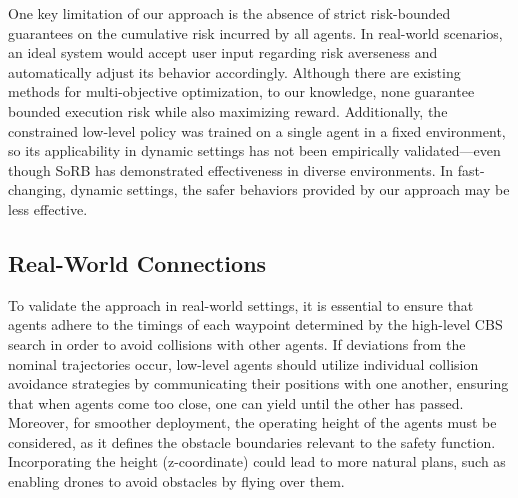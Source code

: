 \documentclass{article}
\begin{document}
One key limitation of our approach is the absence of strict risk-bounded guarantees on the cumulative risk incurred by all agents. In real-world scenarios, an ideal system would accept user input regarding risk averseness and automatically adjust its behavior accordingly. Although there are existing methods for multi-objective optimization, to our knowledge, none guarantee bounded execution risk while also maximizing reward. Additionally, the constrained low-level policy was trained on a single agent in a fixed environment, so its applicability in dynamic settings has not been empirically validated—even though SoRB has demonstrated effectiveness in diverse environments. In fast-changing, dynamic settings, the safer behaviors provided by our approach may be less effective.

\subsection{Real-World Connections}

To validate the approach in real-world settings, it is essential to ensure that agents adhere to the timings of each waypoint determined by the high-level CBS search in order to avoid collisions with other agents. If deviations from the nominal trajectories occur, low-level agents should utilize individual collision avoidance strategies by communicating their positions with one another, ensuring that when agents come too close, one can yield until the other has passed. Moreover, for smoother deployment, the operating height of the agents must be considered, as it defines the obstacle boundaries relevant to the safety function. Incorporating the height (z-coordinate) could lead to more natural plans, such as enabling drones to avoid obstacles by flying over them.
\end{document}

